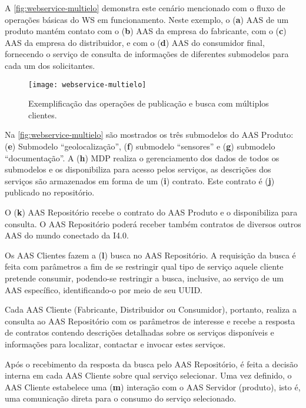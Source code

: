 A \autoref{fig:webservice-multielo} demonstra este cenário mencionado com o fluxo de operações básicas do WS em funcionamento. Neste exemplo, o (\textbf{a}) AAS de um produto mantém contato com o (\textbf{b}) AAS da empresa do fabricante, com o (\textbf{c}) AAS da empresa do distribuidor, e com o (\textbf{d}) AAS do consumidor final, fornecendo o serviço de consulta de informações de diferentes submodelos para cada um dos solicitantes.

\begin{figure}[htb]
	\centering
	\texttt{[image: webservice-multielo]}
	\caption{Exemplificação das operações de publicação e busca com múltiplos clientes.}
	\label{fig:webservice-multielo}
\end{figure}

Na \autoref{fig:webservice-multielo} são mostrados os três submodelos do AAS Produto: (\textbf{e}) Submodelo ``geolocalização'', (\textbf{f}) submodelo ``sensores'' e (\textbf{g}) submodelo ``documentação''. A (\textbf{h}) MDP realiza o gerenciamento dos dados de todos os submodelos e os disponibiliza para acesso pelos serviços, as descrições dos serviços são armazenados em forma de um (\textbf{i}) contrato. Este contrato é (\textbf{j}) publicado no repositório.

O (\textbf{k}) AAS Repositório recebe o contrato do AAS Produto e o disponibiliza para consulta. O AAS Repositório poderá receber também contratos de diversos outros AAS do mundo conectado da I4.0.

Os AAS Clientes fazem a (\textbf{l}) busca no AAS Repositório. A requisição da busca é feita com parâmetros a fim de se restringir qual tipo de serviço aquele cliente pretende consumir, podendo-se restringir a busca, inclusive, ao serviço de um AAS específico, identificando-o por meio de seu UUID.

Cada AAS Cliente (Fabricante, Distribuidor ou Consumidor), portanto, realiza a consulta ao AAS Repositório com os parâmetros de interesse e recebe a resposta de contratos contendo descrições detalhadas sobre os serviços disponíveis e informações para localizar, contactar e invocar estes serviços.

Após o recebimento da resposta da busca pelo AAS Repositório, é feita a decisão interna em cada AAS Cliente sobre qual serviço selecionar. Uma vez definido, o AAS Cliente estabelece uma (\textbf{m}) interação com o AAS Servidor (produto), isto é, uma comunicação direta para o consumo do serviço selecionado.

